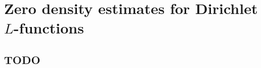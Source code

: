 \chapter{Zero density estimates for Dirichlet $L$-functions}\label{zero-density-L-functions}

\section{TODO}